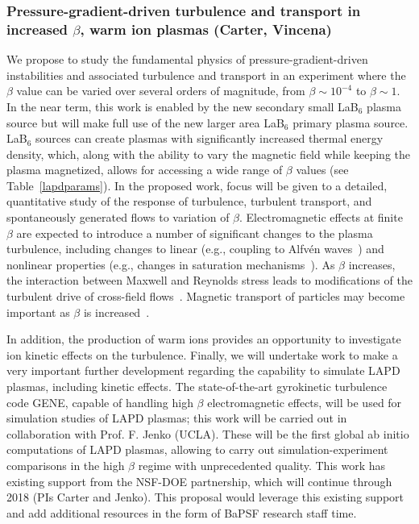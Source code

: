 \documentclass[11pt]{article}
\renewcommand{\cite}{\citep}
\begin{document}
\subsubsection{Pressure-gradient-driven turbulence and transport in increased $\beta$, warm ion
  plasmas (Carter, Vincena) } 

We propose to study the fundamental physics of
pressure-gradient-driven instabilities and associated turbulence and
transport in an experiment where the $\beta$ value can be varied over
several orders of magnitude, from $\beta\sim 10^{-4}$ to $\beta\sim
1$. In the near term, this work is enabled by the new secondary small
LaB$_6$ plasma source but will make full use of the new larger area
LaB$_6$ primary plasma source. LaB$_6$ sources can create plasmas with
significantly increased thermal energy density, which, along with the
ability to vary the magnetic field while keeping the plasma
magnetized, allows for accessing a wide range of $\beta$ values (see
Table~\ref{lapdparams}). In the proposed work, focus will be given to
a detailed, quantitative study of the response of turbulence,
turbulent transport, and spontaneously generated flows to variation of
$\beta$. Electromagnetic effects at finite $\beta$ are expected to
introduce a number of significant changes to the plasma turbulence,
including changes to linear (e.g., coupling to Alfv\'{e}n
waves~\cite{dalf99,morales99,burke00,zweben79}) and nonlinear
properties (e.g., changes in saturation
mechanisms~\cite{ppcf01,em1,em2}).  As $\beta$ increases, the
interaction between Maxwell and Reynolds stress leads to modifications
of the turbulent drive of cross-field
flows~\cite{stress1,stress2}. Magnetic transport of particles may
become important as $\beta$ is increased~\cite{liewer85,stoneking94}.  

In addition, the production of warm ions provides an opportunity to
investigate ion kinetic effects on the turbulence.  Finally, we will
undertake work to make a very important further development regarding
the capability to simulate LAPD plasmas, including kinetic
effects. The state-of-the-art gyrokinetic turbulence code GENE,
capable of handling high $\beta$ electromagnetic effects, will be used
for simulation studies of LAPD plasmas; this work will be carried out
in collaboration with Prof. F. Jenko (UCLA). These will be the first
global ab initio computations of LAPD plasmas, allowing to carry out
simulation-experiment comparisons in the high $\beta$ regime with
unprecedented quality.  This work has existing support from the
NSF-DOE partnership, which will continue through 2018 (PIs Carter and Jenko). This proposal would
leverage this existing support and add additional resources in the
form of BaPSF research staff time.
\end{document}
